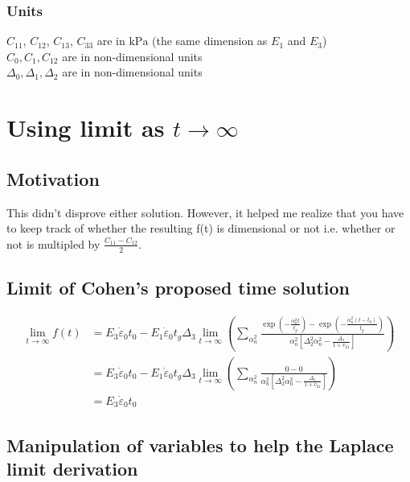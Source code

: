 \documentclass{article}
\begin{document}
\subsubsection{Units} 
$C_{11}$, $C_{12}$, $C_{13}$, $C_{33}$ are in $\mathrm{kPa}$ (the same dimension as $E_{1}$ and $E_{3}$) \\
$C_{0}, C_{1}, C_{12}$ are in non-dimensional units \\
$\Delta_{0}, \Delta_{1}, \Delta_{2}$ are in non-dimensional units \\

\section{Using limit as $t \rightarrow \infty$}
\subsection{Motivation}
This didn't disprove either solution. However, it helped me realize that you have to keep track of whether the resulting f(t) is dimensional or not i.e. whether or not is multipled by $\frac{C_{11}-C_{12}}{2}$.

\subsection{Limit of Cohen's proposed time solution}

\begin{align}
\lim _{t \rightarrow \infty} f(t) &= E_{3} \dot{\varepsilon}_{0} t_{0}-E_{1} \dot{\varepsilon}_{0} t_{g} \Delta_{3} \lim _{t \rightarrow \infty}\left(\sum_{\alpha_{n}^{2}} \frac{\exp \left(-\frac{\alpha_{n}^{2} t}{t_{g}}\right)-\exp \left(-\frac{\alpha_{n}^{2}\left(t-t_{0}\right)}{t_{g}}\right)}{\alpha_{n}^{2}\left[\Delta_{2}^{2} \alpha_{n}^{2}-\frac{\Delta_{1}}{1+v_{21}}\right]}\right) \\
&= E_{3} \dot{\varepsilon}_{0} t_{0}-E_{1} \dot{\varepsilon}_{0} t_{g} \Delta_{3} \lim _{t \rightarrow \infty}\left(\sum_{\alpha_{n}^{2}} \frac{0-0}{\alpha_{n}^{2}\left[\Delta_{2}^{2} \alpha_{n}^{2}-\frac{\Delta_{1}}{1+v_{21}}\right]}\right) \\ 
&= E_{3} \dot{\varepsilon}_{0} t_{0}
\end{align}

\subsection{Manipulation of variables to help the Laplace limit derivation}\label{variable-manipulation-to-help-laplace-limit-derivation}
\end{document}
